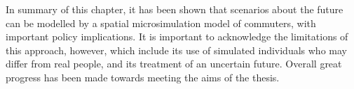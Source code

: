 
In summary of this chapter, it has been shown that
scenarios about the future can
be modelled by a spatial microsimulation model of commuters, with important
policy implications. It is important to acknowledge the limitations of this
approach, however, which include its use of simulated individuals who
may differ from real people, and its treatment of an uncertain future.
Overall great progress has been made towards meeting the aims of the thesis.


% 

